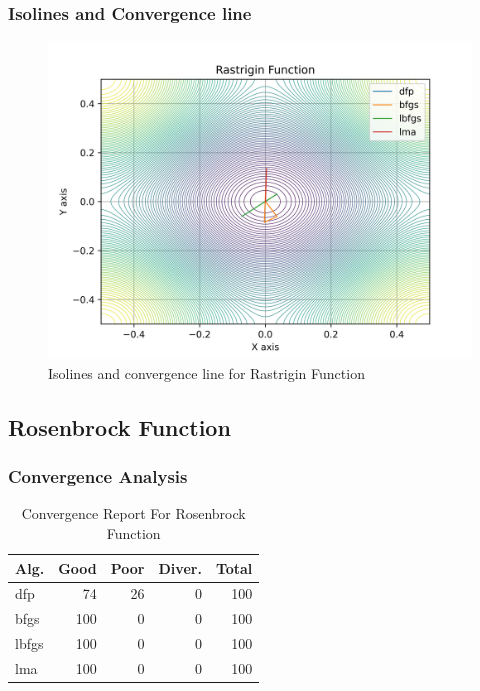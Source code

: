 \documentclass[conference]{IEEEtran}
\begin{document}
\subsubsection{Isolines and Convergence line}
\label{isolinesrastrigin2d2D}

\begin{figure}[H]
\centering
\caption{Isolines and convergence line for Rastrigin Function}
\label{fig:rastrigin2d}
\includegraphics[scale=0.5]{images/rastrigin2d.jpg}
\end{figure}
\subsection{Rosenbrock Function}
\label{rosenbrock2d2D}

\subsubsection{Convergence Analysis}
\label{convergencerosenbrock2d2D}

\begin{table}[H]
\centering
\caption{Convergence Report For Rosenbrock Function}
\label{convergence:rosenbrock2d}
\begin{tabular}{lrrrr}
\toprule
 Alg. &  Good &  Poor &  Diver. &  Total \\
\midrule
  dfp &    74 &    26 &       0 &    100 \\
 bfgs &   100 &     0 &       0 &    100 \\
lbfgs &   100 &     0 &       0 &    100 \\
  lma &   100 &     0 &       0 &    100 \\
\bottomrule
\end{tabular}
\end{table}
\end{document}
